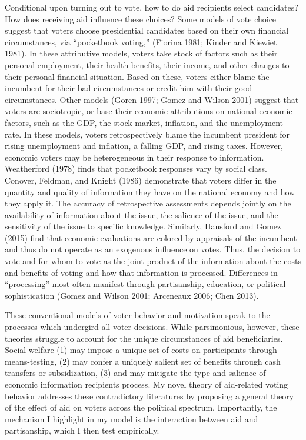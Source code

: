 \documentclass[12pt]{paper}
\begin{document}
Conditional upon turning out to vote, how to do aid recipients select candidates? How does receiving aid influence these choices? Some models of vote choice suggest that voters choose presidential candidates based on their own financial circumstances, via ``pocketbook voting,” (Fiorina 1981; Kinder and Kiewiet 1981). In these attributive models, voters take stock of factors such as their personal employment, their health benefits, their income, and other changes to their personal financial situation. Based on these, voters either blame the incumbent for their bad circumstances or credit him with their good circumstances. Other models (Goren 1997; Gomez and Wilson 2001) suggest that voters are sociotropic, or base their economic attributions on national economic factors, such as the GDP, the stock market, inflation, and the unemployment rate. In these models, voters retrospectively blame the incumbent president for rising unemployment and inflation, a falling GDP, and rising taxes.  However, economic voters may be heterogeneous in their response to information. Weatherford (1978) finds that pocketbook responses vary by social class. Conover, Feldman, and Knight  (1986) demonstrate that voters differ in the quantity and quality of information they have on the national economy and how they apply it. The accuracy of retrospective assessments depends jointly on the availability of information about the issue, the salience of the issue, and the sensitivity of the issue to specific knowledge. Similarly, Hansford and Gomez (2015) find that economic evaluations are colored by appraisals of the incumbent and thus do not operate as an exogenous influence on votes. Thus, the decision to vote and for whom to vote as the joint product of the information about the costs and benefits of voting and how that information is processed. Differences in “processing” most often manifest through partisanship, education, or political sophistication (Gomez and Wilson 2001; Arceneaux 2006; Chen 2013). 

These conventional models of voter behavior and motivation speak to the processes which undergird all voter decisions. While parsimonious, however, these theories struggle to account for the unique circumstances of aid beneficiaries. Social welfare (1) may impose a unique set of costs on participants through means-testing, (2) may confer a uniquely salient set of benefits through cash transfers or subsidization, (3) and may mitigate the type and salience of economic information recipients process. My novel theory of aid-related voting behavior addresses these contradictory literatures by proposing a general theory of the effect of aid on voters across the political spectrum. Importantly, the mechanism I highlight in my model is the interaction between aid and partisanship, which I then test empirically.
\end{document}
